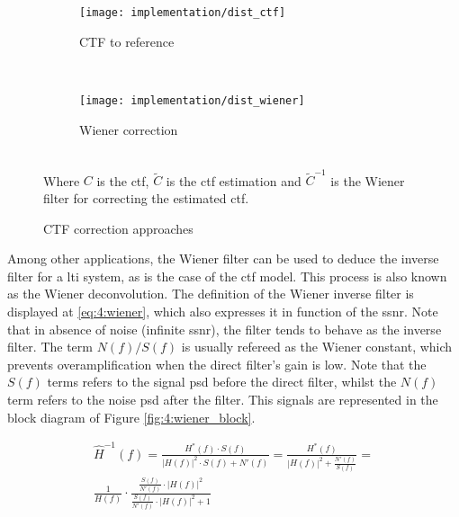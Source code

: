 \documentclass[../main.tex]{subfiles}
\begin{document}
\begin{figure}[htbp]
    \centering
    \begin{subfigure}[b]{\textwidth}
         \centering
         \texttt{[image: implementation/dist\_ctf]}
         \caption{CTF to reference}
         \label{fig:4:wiener:ctf}
    \end{subfigure}\\
    \vspace{2em}
    \begin{subfigure}[b]{\textwidth}
         \centering
         \texttt{[image: implementation/dist\_wiener]}
         \caption{Wiener correction}
         \label{fig:4:wiener:wiener}
    \end{subfigure}\\
    Where $C$ is the \gls{ctf}, $\tilde{C}$ is the \gls{ctf} estimation and $\tilde{C}^{-1}$ is the Wiener filter for correcting the estimated \gls{ctf}.
    \caption{CTF correction approaches}
    \label{fig:4:wiener}
\end{figure}

Among other applications, the Wiener filter can be used to deduce the inverse filter for a \gls{lti} system, as is the case of the \gls{ctf} model. This process is also known as the Wiener deconvolution. The definition of the Wiener inverse filter is displayed at \eqref{eq:4:wiener}, which also expresses it in function of the \gls{ssnr}. Note that in absence of noise (infinite \gls{ssnr}), the filter tends to behave as the inverse filter\cite{wetzstein2018}. The term $N(f)/S(f)$ is usually refereed as the Wiener constant, which prevents overamplification when the direct filter's gain is low. Note that the $S(f)$ terms refers to the signal \gls{psd} before the direct filter, whilst the $N(f)$ term refers to the noise \gls{psd} after the filter. This signals are represented in the block diagram of Figure \ref{fig:4:wiener_block}.

\begin{equation}\label{eq:4:wiener}
\begin{split}
    \hat{H}^{-1}(f) = 
    \frac{H^*(f) \cdot S(f)}{\left\vert H(f) \right\vert^2 \cdot S(f) + N'(f)} = 
    \frac{H^*(f)}{\left\vert H(f) \right\vert^2 + \frac{N'(f)}{S(f)}} = \\
    \frac{1}{H(f)} \cdot \frac{\frac{S(f)}{N'(f)} \cdot \left\vert H(f) \right\vert^2}{\frac{S(f)}{N'(f)} \cdot \left\vert H(f) \right\vert^2 + 1}
\end{split}
\end{equation}
\end{document}
